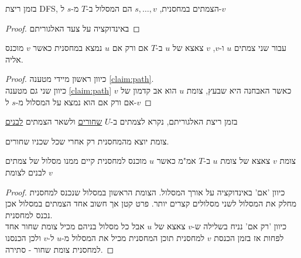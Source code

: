 \begin{claim}
\label{claim:path}
בזמן ריצת DFS, הצמתים במחסנית, 
$s,\ldots,v$
הם המסלול ב-$T$ מ-$s$ ל-$v$
\end{claim}
\begin{proof}
באינדוקציה על צעד האלגוריתם
\end{proof}
\begin{corollary}
עבור שני צמתים $u$ ו-$v$, $v$ צאצא של $u$ ב-$T$ אם ורק אם $u$ נמצא במחסנית כאשר $v$ מוכנס 
אליה.
\end{corollary}
\begin{proof}
כיוון ראשון מיידי מטענה
\ref{claim:path}.
\\
כיוון שני גם מטענה 
\ref{claim:path}
כאשר האבחנה היא שבעץ, צומת $u$ הוא אב קדמון של $v$ אם ורק אם הוא נמצא על המסלול מ-$s$
ל-$v$
\end{proof}

\begin{definition}
בזמן ריצת האלגוריתם, נקרא לצמתים ב-$U$ 
\underline{שחורים}
ולשאר הצמתים 
\underline{לבנים}
\end{definition}

\begin{observation}
צומת יוצא מהמחסנית רק אחרי שכל שכניו שחורים.
\end{observation}

\begin{lemma}
צומת $v$ צאצא של צומת $u$ ב-$T$ אמ"מ כאשר $u$ 
מוכנס למחסנית קיים ממנו מסלול של צמתים לבנים לצומת $v$
\end{lemma}
\begin{proof}
כיוון 'אם' באינדוקציה על אורך המסלול.
הצומת הראשון במסלול שנכנס למחסנית מחלק את המסלול לשני מסלולים קצרים יותר.
פרט קטן אך חשוב אחד הצמתים במסלול אכן נכנס למחסנית.
\\
כיוון 'רק אם' נניח בשלילה ש-$v$ צאצא של $u$ אבל כל מסלול בניהם מכיל צומת שחור אחד לפחות
אז בזמן הכנסת $v$ למחסנית תוכן המחסנית מכיל את המסלול מ-$u$ ל-$v$ ולכן הכנסנו למחסנית 
צומת שחור - סתירה.
\end{proof}
